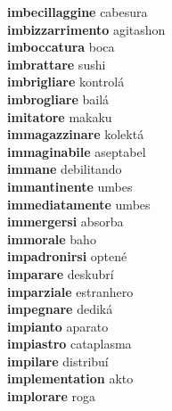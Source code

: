 \textbf{imbecillaggine } cabesura \\
\textbf{imbizzarrimento } agitashon \\
\textbf{imboccatura } boca \\
\textbf{imbrattare } sushi \\
\textbf{imbrigliare } kontrolá \\
\textbf{imbrogliare } bailá \\
\textbf{imitatore } makaku \\
\textbf{immagazzinare } kolektá \\
\textbf{immaginabile } aseptabel \\
\textbf{immane } debilitando \\
\textbf{immantinente } umbes \\
\textbf{immediatamente } umbes \\
\textbf{immergersi } absorba \\
\textbf{immorale } baho \\
\textbf{impadronirsi } optené \\
\textbf{imparare } deskubrí \\
\textbf{imparziale } estranhero \\
\textbf{impegnare } dediká \\
\textbf{impianto } aparato \\
\textbf{impiastro } cataplasma \\
\textbf{impilare } distribuí \\
\textbf{implementation } akto \\
\textbf{implorare } roga \\
